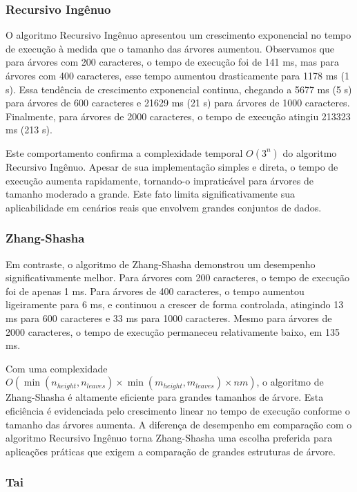 \documentclass[12pt]{article}
\begin{document}
\subsubsection{Recursivo Ingênuo}

O algoritmo Recursivo Ingênuo apresentou um crescimento exponencial no tempo de execução à medida que o tamanho das árvores aumentou. Observamos que para árvores com 200 caracteres, o tempo de execução foi de 141 ms, mas para árvores com 400 caracteres, esse tempo aumentou drasticamente para 1178 ms (1 s). Essa tendência de crescimento exponencial continua, chegando a 5677 ms (5 s) para árvores de 600 caracteres e 21629 ms (21 s) para árvores de 1000 caracteres. Finalmente, para árvores de 2000 caracteres, o tempo de execução atingiu 213323 ms (213 s).

Este comportamento confirma a complexidade temporal \(O(3^n)\) do algoritmo Recursivo Ingênuo. Apesar de sua implementação simples e direta, o tempo de execução aumenta rapidamente, tornando-o impraticável para árvores de tamanho moderado a grande. Este fato limita significativamente sua aplicabilidade em cenários reais que envolvem grandes conjuntos de dados.

\subsubsection{Zhang-Shasha}

Em contraste, o algoritmo de Zhang-Shasha demonstrou um desempenho significativamente melhor. Para árvores com 200 caracteres, o tempo de execução foi de apenas 1 ms. Para árvores de 400 caracteres, o tempo aumentou ligeiramente para 6 ms, e continuou a crescer de forma controlada, atingindo 13 ms para 600 caracteres e 33 ms para 1000 caracteres. Mesmo para árvores de 2000 caracteres, o tempo de execução permaneceu relativamente baixo, em 135 ms.

Com uma complexidade \(O(\min(n_{height}, n_{leaves}) \times \min(m_{height}, m_{leaves}) \times nm)\), o algoritmo de Zhang-Shasha é altamente eficiente para grandes tamanhos de árvore. Esta eficiência é evidenciada pelo crescimento linear no tempo de execução conforme o tamanho das árvores aumenta. A diferença de desempenho em comparação com o algoritmo Recursivo Ingênuo torna Zhang-Shasha uma escolha preferida para aplicações práticas que exigem a comparação de grandes estruturas de árvore.

\subsubsection{Tai}
\end{document}
